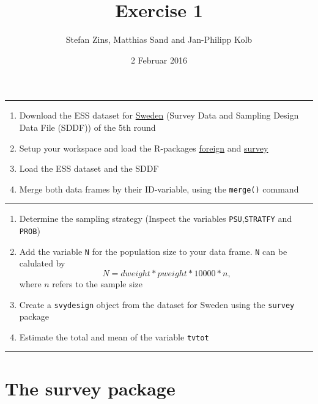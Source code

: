 \documentclass[]{article}
\title{Exercise 1}
\author{Stefan Zins, Matthias Sand and Jan-Philipp Kolb}
\date{2 Februar 2016}
\begin{document}
\maketitle


\begin{center}\rule{0.5\linewidth}{\linethickness}\end{center}

\begin{enumerate}
\def\labelenumi{\arabic{enumi}.}
\itemsep1pt\parskip0pt
\item
  Download the ESS dataset for
  \href{http://www.europeansocialsurvey.org/data/country.html?c=sweden}{Sweden}
  (Survey Data and Sampling Design Data File (SDDF)) of the 5th round
\item
  Setup your workspace and load the R-packages
  \href{https://cran.r-project.org/web/packages/foreign/foreign.pdf}{foreign}
  and
  \href{https://cran.r-project.org/web/packages/survey/index.html}{survey}
\item
  Load the ESS dataset and the SDDF
\item
  Merge both data frames by their ID-variable, using the
  \texttt{merge()} command
\end{enumerate}

\begin{center}\rule{0.5\linewidth}{\linethickness}\end{center}

\begin{enumerate}
\def\labelenumi{\arabic{enumi}.}
\setcounter{enumi}{4}
\itemsep1pt\parskip0pt
\item
  Determine the sampling strategy (Inspect the variables
  \texttt{PSU},\texttt{STRATFY} and \texttt{PROB})
\item
  Add the variable \texttt{N} for the population size to your data
  frame. \texttt{N} can be calulated by
  \[N= dweight* pweight *10000*n \text{,}\] where \(n\) refers to the
  sample size
\item
  Create a \texttt{svydesign} object from the dataset for Sweden using
  the \texttt{survey} package
\item
  Estimate the total and mean of the variable \texttt{tvtot}
\end{enumerate}

\begin{center}\rule{0.5\linewidth}{\linethickness}\end{center}

\section{The survey package}\label{the-survey-package}
\end{document}
